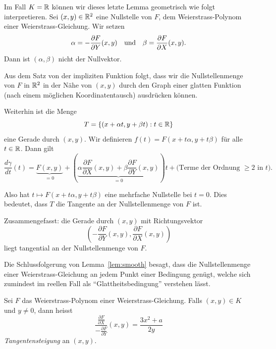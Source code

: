 \begin{bemerkung}
  \label{bem:tangente}
  Im Fall $K={\mathbb{R}}$ können wir dieses letzte Lemma geometrisch wie folgt
  interpretieren.
  Sei $(x,y)\in{\mathbb{R}}^2$ eine Nullstelle von $F$, dem Weierstrass-Polynom
  einer Weierstrass-Gleichung. Wir setzen
  $$\alpha = -\frac{\partial F}{\partial Y}(x,y) \quad\text{und}\quad
  \beta = \frac{\partial F}{\partial X}(x,y).$$
  Dann ist $(\alpha,\beta)$ nicht der Nullvektor.

  Aus dem Satz von der impliziten Funktion folgt, dass wir die
  Nullstellenmenge von $F$ in ${\mathbb{R}}^2$ in der Nähe von $(x,y)$ durch
  den Graph einer glatten Funktion (nach einem möglichen Koordinatentausch)
  ausdrücken können. 

  Weiterhin ist die Menge
  \begin{equation*}
    T = \{(x+\alpha t,y+\beta t) : t\in{\mathbb{R}}\}
  \end{equation*}
  eine Gerade durch $(x,y)$. Wir definieren $f(t) =
  F(x+t\alpha,y+t\beta)$ für alle $t\in{\mathbb{R}}$. 
  Dann gilt 
  \begin{equation*}
    \frac{d\gamma}{dt}(t)
    = \underbrace{F(x,y)}_{=0} + \left(\underbrace{\alpha \frac{\partial F}{\partial X}(x,y)
    +\beta \frac{\partial F}{\partial Y}(x,y)}_{=0}\right)t + \text{(Terme der
      Ordnung $\ge 2$ in $t$)}.
  \end{equation*}
  
  Also hat $t\mapsto F(x+t\alpha,y+t\beta)$ eine mehrfache Nullstelle
  bei $t=0$. Dies bedeutet, dass $T$ die Tangente an der
  Nullstellenmenge von $F$ ist.

  Zusammengefasst: die Gerade durch $(x,y)$ mit Richtungsvektor
  \begin{equation*}
    \left(-\frac{\partial F}{\partial Y}(x,y),\frac{\partial F}{\partial X}(x,y)\right)
  \end{equation*}
  liegt tangential an der Nullstellenmenge von $F$.
\end{bemerkung}

Die Schlussfolgerung von Lemma~\ref{lem:smooth} besagt, dass die
Nullstellenmenge einer Weierstrass-Gleichung an jedem Punkt einer
Bedingung genügt, welche sich zumindest im reellen Fall
als ``Glattheitsbedingung'' verstehen lässt.

\begin{definition}
  \label{def:tangentensteigung}
  Sei $F$ das Weierstrass-Polynom einer Weierstrass-Gleichung. Falls
  $(x,y)\in K$ und $y\not=0$, dann heisst
  \begin{equation*}
    \frac{\frac{\partial F}{\partial X}}{-\frac{\partial F}{\partial
        Y}}(x,y) = \frac{3x^2+a}{2y}
  \end{equation*}
  \emph{Tangentensteigung} an $(x,y)$. 
\end{definition}

